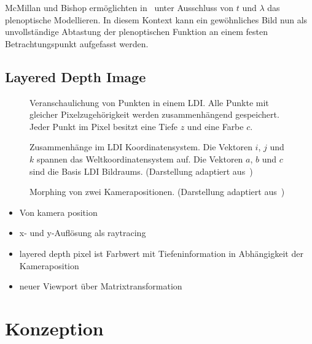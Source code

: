\documentclass[hyperref, beleg, german]{cgvpub}
\begin{document}
McMillan und Bishop ermöglichten in~\cite{mcmillan1995plenoptic} unter
Ausschluss von \( t \) und \( \lambda \) das plenoptische Modellieren. In
diesem Kontext kann ein gewöhnliches Bild nun als unvollständige Abtastung der
plenoptischen Funktion an einem festen Betrachtungspunkt aufgefasst werden.

\section{Layered Depth Image}

\begin{figure}
	\centering
	
	\caption{Veranschaulichung von Punkten in einem LDI. Alle Punkte mit
	gleicher Pixelzugehörigkeit werden zusammenhängend gespeichert. Jeder
	Punkt im Pixel besitzt eine Tiefe \(z\) und eine Farbe \(c\).}%
	\label{fig:layereddepthimage}
\end{figure}

\begin{figure}
	\centering
	
	\caption{Zusammenhänge im LDI Koordinatensystem. Die Vektoren \(i\),
	\(j\) und \(k\) spannen das Weltkoordinatensystem auf. Die Vektoren
	\(a\), \(b\) und \(c\) sind die Basis LDI Bildraums. (Darstellung 
	adaptiert aus~\cite{mcmillan1997image})}%
	\label{fig:ldicoord}
\end{figure}

\begin{figure}
	\centering
	
	\caption{Morphing von zwei Kamerapositionen. (Darstellung adaptiert
	aus~\cite{mcmillan1997image})}%
	\label{fig:ldimorph}
\end{figure}

\begin{itemize}
	\item Von kamera position
	\item x- und y-Auflösung als raytracing
	\item layered depth pixel ist Farbwert mit Tiefeninformation in Abhängigkeit der
	      Kameraposition
	\item neuer Viewport über Matrixtransformation
\end{itemize}

\chapter{Konzeption}
\end{document}
